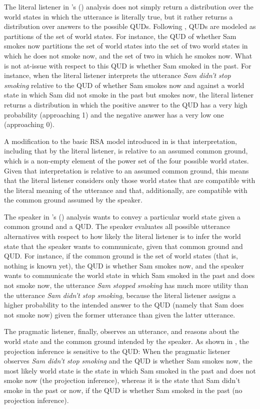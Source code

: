 \documentclass[11pt,fleqn]{article}
\newcommand{\6}{\mbox{$[\hspace*{-.6mm}[$}}
\newcommand{\9}{\mbox{$]\hspace*{-.6mm}]$}}
\newcommand{\citetpos}[1]{\citeauthor{#1}'s (\citeyear{#1})}
\begin{document}
The literal listener in \citetpos{qing-etal2016} analysis does not simply return a distribution over the world states in which the utterance is literally true, but it rather returns a distribution over answers to the possible QUDs. Following \cite{kao-etal2014}, QUDs are modeled as partitions of the set of world states. For instance, the QUD of whether Sam smokes now partitions the set of world states into the set of two world states in which he does not smoke now, and the set of two in which he smokes now. What is not at-issue with respect to this QUD is whether Sam smoked in the past. For instance, when the literal listener interprets the utterance {\em Sam didn't stop smoking} relative to the QUD of whether Sam smokes now and against a world state in which Sam did not smoke in the past but smokes now, the literal listener returns a distribution in which the positive answer to the QUD has a very high probability (approaching 1) and the negative answer has a very low one (approaching 0). 

A modification to the basic RSA model introduced in \cite{qing-etal2016} is that interpretation, including that by the literal listener, is relative to an assumed common ground, which is a non-empty element of the power set of the four possible world states. Given that interpretation is relative to an assumed common ground, this means that the literal listener considers only those world states that are compatible with the literal meaning of the utterance and that, additionally, are compatible with the common ground assumed by the speaker.

The speaker in \citetpos{qing-etal2016} analysis wants to convey a particular world state given a common ground and a QUD. The speaker evaluates all possible utterance alternatives with respect to how likely the literal listener is to infer the world state that the speaker wants to communicate, given that common ground and QUD. For instance, if the common ground is the set of world states (that is, nothing is known yet), the QUD is whether Sam smokes now, and the speaker wants to communicate the world state in which Sam smoked in the past and does not smoke now, the utterance {\em Sam stopped smoking} has much more utility than the utterance {\em Sam didn't stop smoking}, because the literal listener assigns a higher probability to the intended answer to the QUD (namely that Sam does not smoke now) given the former utterance than given the latter utterance. 

The pragmatic listener, finally, observes an utterance, and reasons about the world state and the common ground intended by the speaker. As shown in \cite{qing-etal2016}, the projection inference is sensitive to the QUD: When the pragmatic listener observes {\em Sam didn't stop smoking} and the QUD is whether Sam smokes now, the most likely world state is the state in which Sam smoked in the past and does not smoke now (the projection inference), whereas it is the state that Sam didn't smoke in the past or now, if the QUD is whether Sam smoked in the past (no projection inference).
\end{document}
